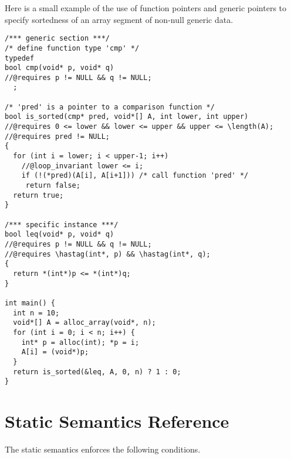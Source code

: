 \documentclass[11pt]{article}
\begin{document}
Here is a small example of the use of function pointers and generic
pointers to specify sortedness of an array segment of non-null generic
data.

\begin{small}
\begin{verbatim}
/*** generic section ***/
/* define function type 'cmp' */
typedef
bool cmp(void* p, void* q)
//@requires p != NULL && q != NULL;
  ;

/* 'pred' is a pointer to a comparison function */
bool is_sorted(cmp* pred, void*[] A, int lower, int upper)
//@requires 0 <= lower && lower <= upper && upper <= \length(A);
//@requires pred != NULL;
{
  for (int i = lower; i < upper-1; i++)
    //@loop_invariant lower <= i;
    if (!(*pred)(A[i], A[i+1])) /* call function 'pred' */
     return false;
  return true;
}

/*** specific instance ***/
bool leq(void* p, void* q)
//@requires p != NULL && q != NULL;
//@requires \hastag(int*, p) && \hastag(int*, q);
{
  return *(int*)p <= *(int*)q;
}

int main() {
  int n = 10;
  void*[] A = alloc_array(void*, n);
  for (int i = 0; i < n; i++) {
    int* p = alloc(int); *p = i;
    A[i] = (void*)p;
  }
  return is_sorted(&leq, A, 0, n) ? 1 : 0;
}
\end{verbatim}
\end{small}

\clearpage
\section{Static Semantics Reference}

The static semantics enforces the following conditions.
\end{document}
